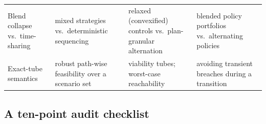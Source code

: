 \begin{table}[!htbp]
\begin{tabularx}{\textwidth}{@{}>{\raggedright\arraybackslash}p{}>{\raggedright\arraybackslash}X>{\raggedright\arraybackslash}X>{\raggedright\arraybackslash}X@{}}
\addlinespace
Blend collapse vs.\ time-sharing & mixed strategies vs.\ deterministic sequencing & relaxed (convexified) controls vs.\ plan-granular alternation & blended policy portfolios vs.\ alternating policies \\
\addlinespace
Exact-tube semantics & robust path-wise feasibility over a scenario set & viability tubes; worst-case reachability & avoiding transient breaches during a transition \\
\bottomrule
\end{tabularx}
\end{table}

\subsection{A ten-point audit checklist}

